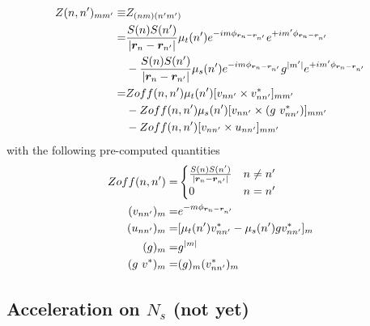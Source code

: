 \documentclass [10pt,letterpaper]{article}
\begin{document}
\begin{equation} \label{eq:def-Znnp-off-diagonal}
	\begin{split}
		Z(n,n^\prime)_{m m^\prime}
		\equiv &
		Z_{(n m)(n^\prime m^\prime)}
		\\
		=& 
		\frac{S(n) S(n^\prime)}{\lvert \vectorsym{r}_n-\vectorsym{r}_{n^\prime} \rvert} 
		\mu_t(n^\prime)
		e^{-i m \phi_{\vectorsym{r}_n-\vectorsym{r}_{n^\prime}}}
		e^{+i m^\prime \phi_{\vectorsym{r}_n-\vectorsym{r}_{n^\prime}}}
		\\
		&- 
		\frac{S(n) S(n^\prime)}{\lvert \vectorsym{r}_n-\vectorsym{r}_{n^\prime} \rvert} 
		\mu_s(n^\prime)
		e^{-i m \phi_{\vectorsym{r}_n-\vectorsym{r}_{n^\prime}}}
		g^{\lvert m^\prime \rvert} 
		e^{+i m^\prime \phi_{\vectorsym{r}_n-\vectorsym{r}_{n^\prime}}}
		\\
		=& 
		Zoff(n,n^\prime)
		\mu_t(n^\prime)
		[
			v_{n n^\prime}
			\times
			v^*_{n n^\prime} 
		]
		_{m m^\prime}
		\\
		&- 
		Zoff(n,n^\prime)
		\mu_s(n^\prime)
		[
			v_{n n^\prime}
			\times
			(g\ v^*_{n n^\prime})
		]
		_{m m^\prime}
		\\
		&- 
		Zoff(n,n^\prime)
		[
			v_{n n^\prime}
			\times
			u_{n n^\prime}
		]_{m m^\prime}
	\end{split}
\end{equation}
with the following pre-computed quantities
\begin{subequations} \label{eq:def-Zoff-v-u-g}
	\begin{align}
		Zoff(n,n^\prime)
		=&
		\begin{cases}
			\frac
			{S(n)S(n^\prime)}
			{\lvert \vectorsym{r}_n-\vectorsym{r}_{n^\prime} \rvert} 
			&
			n \neq n^\prime
			\\
			0
			&
			n=n^\prime 
		\end{cases}
		\label{eq:def-Zoffnnp}
		\\
		(v_{n n^\prime})_m
		=&
		e^{- m \phi_{\vectorsym{r}_n-\vectorsym{r}_{n^\prime}}}
		\label{eq:def-vnnp}
		\\
		(u_{n n^\prime})_m
		=&
		[
			\mu_t(n^\prime)
			v^*_{n n^\prime}
			-
			\mu_s(n^\prime)
			g
			v^*_{n n^\prime}
		]_m
		\label{eq:def-unnp}
		\\
		(g)_m
		=&
		g^{\lvert m \rvert}
		\\
		(g\ v^*)_m
		=&
		(g)_m
		(v^*_{n n^\prime})_m 
		\label{eq:def-gm}
	\end{align}
\end{subequations}

\subsection{Acceleration on $N_s$ (not yet)}
\label{sub:acceleration-on-Ns}
\end{document}
